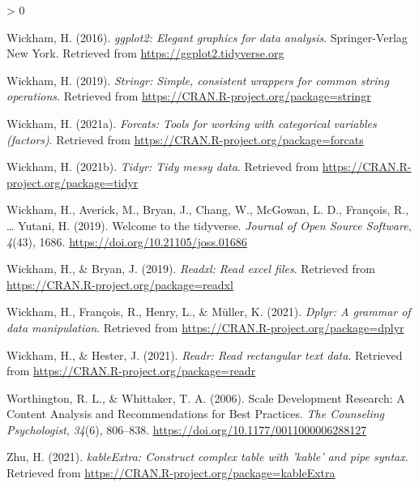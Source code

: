 \documentclass[
  english,
  man]{apa6}
\newlength{\cslhangindent}
\newenvironment{CSLReferences}[2] %
 {%
  \setlength{\parindent}{0pt}
  \ifodd #1 \everypar{\setlength{\hangindent}{\cslhangindent}}\ignorespaces\fi
  \ifnum #2 > 0
  \setlength{\parskip}{#2\baselineskip}
  \fi
 }%
 {}
\begin{document}
\begin{CSLReferences}{1}{0}
\leavevmode\hypertarget{ref-R-ggplot2}{}%
Wickham, H. (2016). \emph{ggplot2: Elegant graphics for data analysis}. Springer-Verlag New York. Retrieved from \url{https://ggplot2.tidyverse.org}

\leavevmode\hypertarget{ref-R-stringr}{}%
Wickham, H. (2019). \emph{Stringr: Simple, consistent wrappers for common string operations}. Retrieved from \url{https://CRAN.R-project.org/package=stringr}

\leavevmode\hypertarget{ref-R-forcats}{}%
Wickham, H. (2021a). \emph{Forcats: Tools for working with categorical variables (factors)}. Retrieved from \url{https://CRAN.R-project.org/package=forcats}

\leavevmode\hypertarget{ref-R-tidyr}{}%
Wickham, H. (2021b). \emph{Tidyr: Tidy messy data}. Retrieved from \url{https://CRAN.R-project.org/package=tidyr}

\leavevmode\hypertarget{ref-R-tidyverse}{}%
Wickham, H., Averick, M., Bryan, J., Chang, W., McGowan, L. D., François, R., \ldots{} Yutani, H. (2019). Welcome to the {tidyverse}. \emph{Journal of Open Source Software}, \emph{4}(43), 1686. \url{https://doi.org/10.21105/joss.01686}

\leavevmode\hypertarget{ref-R-readxl}{}%
Wickham, H., \& Bryan, J. (2019). \emph{Readxl: Read excel files}. Retrieved from \url{https://CRAN.R-project.org/package=readxl}

\leavevmode\hypertarget{ref-R-dplyr}{}%
Wickham, H., François, R., Henry, L., \& Müller, K. (2021). \emph{Dplyr: A grammar of data manipulation}. Retrieved from \url{https://CRAN.R-project.org/package=dplyr}

\leavevmode\hypertarget{ref-R-readr}{}%
Wickham, H., \& Hester, J. (2021). \emph{Readr: Read rectangular text data}. Retrieved from \url{https://CRAN.R-project.org/package=readr}

\leavevmode\hypertarget{ref-worthingtonScaleDevelopmentResearch2006}{}%
Worthington, R. L., \& Whittaker, T. A. (2006). Scale {Development Research}: {A Content Analysis} and {Recommendations} for {Best Practices}. \emph{The Counseling Psychologist}, \emph{34}(6), 806--838. \url{https://doi.org/10.1177/0011000006288127}

\leavevmode\hypertarget{ref-R-kableExtra}{}%
Zhu, H. (2021). \emph{kableExtra: Construct complex table with 'kable' and pipe syntax}. Retrieved from \url{https://CRAN.R-project.org/package=kableExtra}

\end{CSLReferences}

\endgroup
\end{document}
